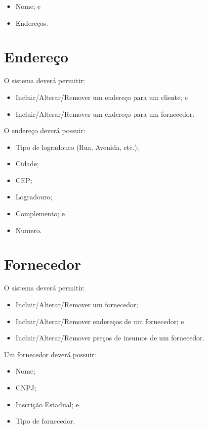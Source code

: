 \begin{itemize}
	\item Nome; e
	\item Endereços.
\end{itemize}

\section{Endereço}

O sistema deverá permitir:

\begin{itemize}
	\item Incluir/Alterar/Remover um endereço para um cliente; e
	\item Incluir/Alterar/Remover um endereço para um fornecedor.
\end{itemize}

O endereço deverá possuir:

\begin{itemize}
	\item Tipo de logradouro (Rua, Avenida, etc.);
	\item Cidade;
	\item CEP;
	\item Logradouro;
	\item Complemento; e
	\item Numero.
\end{itemize}

\section{Fornecedor}

O sistema deverá permitir:

\begin{itemize}
	\item Incluir/Alterar/Remover um fornecedor;
	\item Incluir/Alterar/Remover endereços de um fornecedor; e
	\item Incluir/Alterar/Remover preços de insumos de um fornecedor.
\end{itemize}

Um fornecedor deverá possuir:

\begin{itemize}
	\item Nome;
	\item CNPJ;
	\item Inscrição Estadual; e
	\item Tipo de fornecedor.
\end{itemize}

